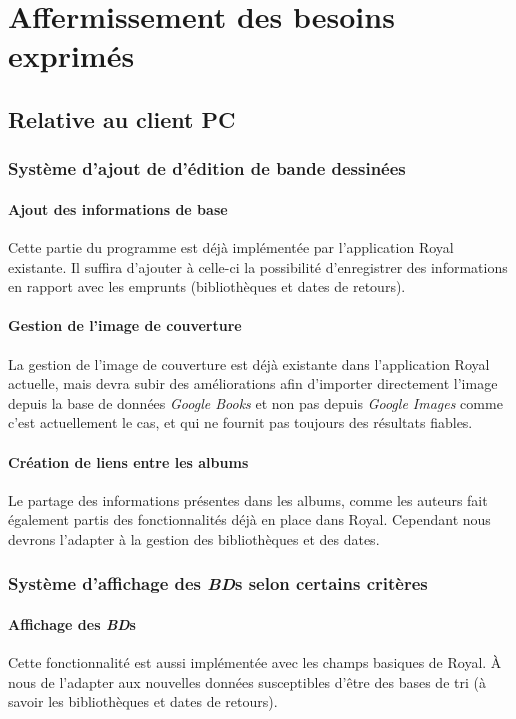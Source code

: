 \section{Affermissement des besoins exprimés} 

\subsection{Relative au client PC}
\subsubsection{Système d'ajout de d'édition de bande dessinées}

\paragraph{Ajout des informations de base}
Cette partie du programme est déjà implémentée par l'application Royal existante. 
Il suffira d'ajouter à celle-ci la possibilité d'enregistrer des informations en rapport avec les emprunts (bibliothèques et dates de retours). 

\paragraph{Gestion de l'image de couverture}
La gestion de l'image de couverture est déjà existante dans l'application Royal actuelle,
	mais devra subir des améliorations afin d'importer directement l'image depuis la base de données \emph{Google Books} et non pas depuis \emph{Google Images} comme c'est actuellement le cas,
	et qui ne fournit pas toujours des résultats fiables.

\paragraph{Création de liens entre les albums}	
Le partage des informations présentes dans les albums, comme les auteurs fait également partis des fonctionnalités déjà en place dans Royal. 
Cependant nous devrons l'adapter à la gestion des bibliothèques et des dates. 

\subsubsection{Système d'affichage des \emph{BD}s selon certains critères}

\paragraph{Affichage des \emph{BD}s}
Cette fonctionnalité est aussi implémentée avec les champs basiques de Royal.
À nous de l'adapter aux nouvelles données susceptibles d'être des bases de tri 
(à savoir les bibliothèques et dates de retours). 


